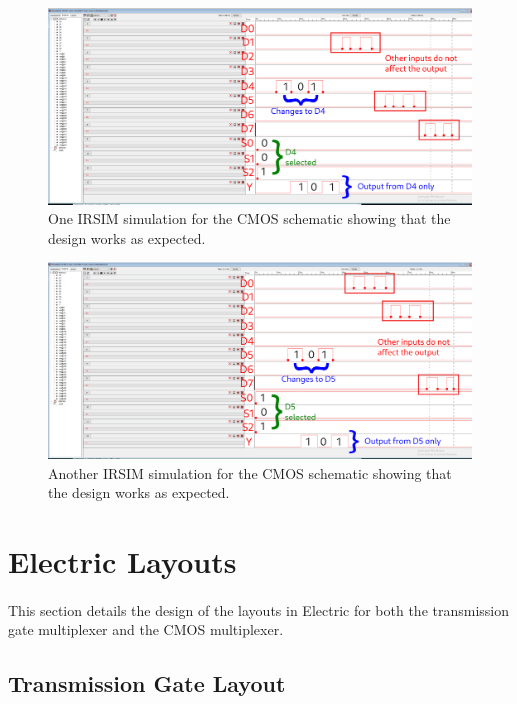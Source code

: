 \documentclass{article}
\begin{document}
    \begin{figure}[H]
      \centering
      \includegraphics[width=\linewidth, frame]{screenshots/cmos/schem/irsim.png}
      \caption{One IRSIM simulation for the CMOS schematic showing that the design works as expected.}
      \label{fig:cmosschemirsim1}
    \end{figure}


    \begin{figure}[H]
      \centering
      \includegraphics[width=\linewidth, frame]{screenshots/cmos/schem/irsim2.png}
      \caption{Another IRSIM simulation for the CMOS schematic showing that the design works as expected.}
      \label{fig:cmosschemirsim2}
    \end{figure}

\section{Electric Layouts}
  \paragraph{}
  This section details the design of the layouts in Electric for both the transmission gate multiplexer and the CMOS multiplexer.

  \subsection{Transmission Gate Layout}
\end{document}
